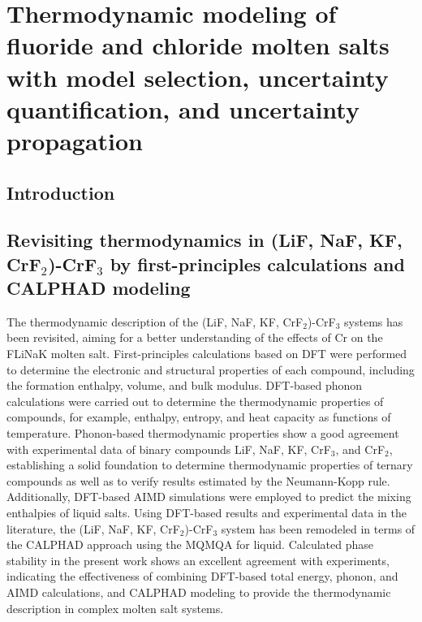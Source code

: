 \chapter{Thermodynamic modeling of fluoride and chloride molten salts with model selection, uncertainty quantification, and uncertainty propagation} \label{chap:moltensalts}

\section{Introduction} \label{moltensalts:sec:intro}

\section{Revisiting thermodynamics in (LiF, NaF, KF, CrF${_2}$)-CrF${_3}$ by first-principles calculations and CALPHAD modeling } \label{moltensalts:sec:FLiNaKCr}
The thermodynamic description of the (LiF, NaF, KF, CrF$_2$)-CrF$_3$ systems has been revisited, aiming for a better understanding of the effects of Cr on the FLiNaK molten salt. First-principles calculations based on DFT were performed to determine the electronic and structural properties of each compound, including the formation enthalpy, volume, and bulk modulus. DFT-based phonon calculations were carried out to determine the thermodynamic properties of compounds, for example, enthalpy, entropy, and heat capacity as functions of temperature. Phonon-based thermodynamic properties show a good agreement with experimental data of binary compounds LiF, NaF, KF, CrF$_3$, and CrF$_2$, establishing a solid foundation to determine thermodynamic properties of ternary compounds as well as to verify results estimated by the Neumann-Kopp rule. Additionally, DFT-based AIMD simulations were employed to predict the mixing enthalpies of liquid salts. Using DFT-based results and experimental data in the literature, the (LiF, NaF, KF, CrF$_2$)-CrF$_3$ system has been remodeled in terms of the CALPHAD approach using the MQMQA for liquid. Calculated phase stability in the present work shows an excellent agreement with experiments, indicating the effectiveness of combining DFT-based total energy, phonon, and AIMD calculations, and CALPHAD modeling to provide the thermodynamic description in complex molten salt systems.

